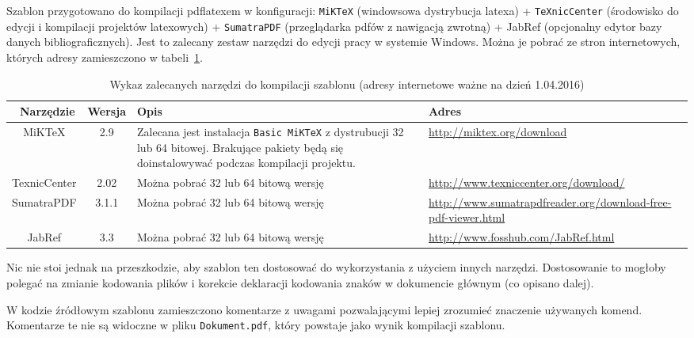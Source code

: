 Szablon przygotowano do kompilacji pdflatexem w konfiguracji: \texttt{MiKTeX} (windowsowa dystrybucja latexa) + \texttt{TeXnicCenter} (środowisko do edycji i kompilacji projektów latexowych) + \texttt{SumatraPDF} (przeglądarka pdfów z nawigacją zwrotną) + JabRef (opcjonalny edytor bazy danych bibliograficznych). Jest to zalecany zestaw narzędzi do edycji pracy w systemie Windows. Można je pobrać ze stron internetowych, których adresy zamieszczono w tabeli~\ref{tab:narzedzia}.
\begin{table}[htb] \small
\centering
\caption{Wykaz zalecanych narzędzi do kompilacji szablonu (adresy internetowe ważne na dzień 1.04.2016)}
\label{tab:narzedzia}
\begin{tabularx}{\linewidth}{|c|c|X|p{6cm}|} \hline\
Narzędzie & Wersja & Opis & Adres \\ \hline\hline
MiKTeX & 2.9 & Zalecana jest instalacja \texttt{Basic MiKTeX} z dystrubucji 32 lub 64 bitowej. Brakujące pakiety będą się doinstalowywać podczas kompilacji projektu. &
\url{http://miktex.org/download} \\ \hline
TexnicCenter & 2.02 &  Można pobrać 32 lub 64 bitową wersję & \url{http://www.texniccenter.org/download/} \\ \hline
SumatraPDF & 3.1.1 & Można pobrać 32 lub 64 bitową wersję & \url{http://www.sumatrapdfreader.org/download-free-pdf-viewer.html} \\ \hline
JabRef & 3.3 & Można pobrać 32 lub 64 bitową wersję & \url{http://www.fosshub.com/JabRef.html} \\ \hline
\end{tabularx}
\end{table}
Nic nie stoi jednak na przeszkodzie, aby szablon ten dostosować do wykorzystania z użyciem innych narzędzi. Dostosowanie to mogłoby polegać na zmianie kodowania plików i korekcie deklaracji kodowania znaków w dokumencie głównym (co opisano dalej).

W kodzie źródłowym szablonu zamieszczono komentarze z uwagami pozwalającymi lepiej zrozumieć znaczenie używanych komend. Komentarze te nie są widoczne w pliku \texttt{Dokument.pdf}, który powstaje jako wynik kompilacji szablonu. 


